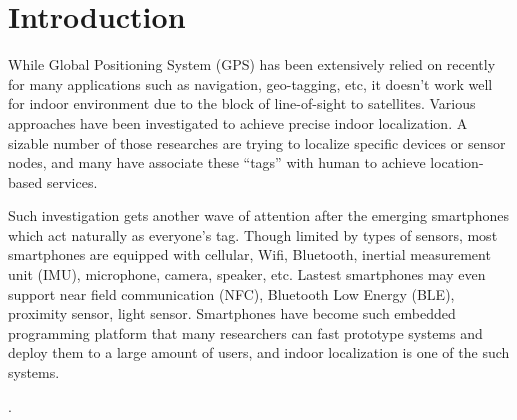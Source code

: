 \section{Introduction}
\label{sec:introduction}

While Global Positioning System (GPS) has been extensively relied on recently for many applications such as navigation, geo-tagging, etc, it doesn't work well for indoor environment due to the block of line-of-sight to satellites. Various approaches have been investigated to achieve precise indoor localization. A sizable number of those researches are trying to localize specific devices or sensor nodes, and many have associate these ``tags'' with human to achieve location-based services. 

Such investigation gets another wave of attention after the emerging smartphones which act naturally as everyone's tag. Though limited by types of sensors, most smartphones are equipped with cellular, Wifi, Bluetooth, inertial measurement unit (IMU), microphone, camera, speaker, etc. Lastest smartphones may even support near field communication (NFC), Bluetooth Low Energy (BLE), proximity sensor, light sensor.
Smartphones have become such embedded programming platform that many researchers can fast prototype systems and deploy them to a large amount of users, and indoor localization is one of the such systems.



\cite{JensenEtAl:11:Lab}.


